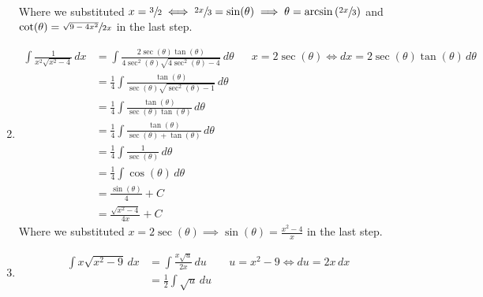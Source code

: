 \begin{Example}{}{}
\begin{enumerate}[label=(\roman*)]
\begin{align*}
              \end{align*}
              Where we substituted $ x=\sfrac{3}{2}\iff \sfrac{2x}{3}=\sin(\theta)\implies
                  \theta=\arcsin\left( \sfrac{2x}{3} \right) $ and $ \cot(\theta)=
                  \sfrac{\sqrt{9-4x^2}}{2x} $ in the last step.
        \item \begin{align*}
                  \int \frac{1}{x^2\sqrt{x^2-4}} \, d{x}
                   & =\int \frac{2\sec(\theta)\tan(\theta)}{4\sec^2(\theta)\sqrt{4\sec^2(\theta)-4}} \, d{\theta} &  & x=2\sec(\theta)\iff dx=2\sec(\theta)\tan(\theta)\,d\theta \\
                   & =\frac{1}{4} \int \frac{\tan(\theta)}{\sec(\theta)\sqrt{\sec^2(\theta)-1}}\, d{\theta}                                                                      \\
                   & =\frac{1}{4} \int \frac{\tan(\theta)}{\sec(\theta)\tan(\theta)} \, d{\theta}                                                                                \\
                   & =\frac{1}{4} \int \frac{\tan(\theta)}{\sec(\theta)+\tan(\theta)} \, d{\theta}                                                                               \\
                   & =\frac{1}{4} \int \frac{1}{\sec(\theta)} \, d{\theta}                                                                                                       \\
                   & =\frac{1}{4} \int \cos(\theta)\, d{\theta}                                                                                                                  \\
                   & =\frac{\sin(\theta)}{4} +C                                                                                                                                  \\
                   & =\frac{\sqrt{x^2-4}}{4x} +C
              \end{align*}
              Where we substituted $ x=2\sec(\theta)\implies \sin(\theta)=\frac{x^2-4}{x} $
              in the last step.
        \item \begin{align*}
                  \int x\sqrt{x^2-9}\, d{x}
                   & =\int \frac{x\sqrt{u}}{2x} \, d{u}                &  & u=x^2-9\iff du=2x\,dx \\
                   & =\frac{1}{2} \int \sqrt{u}\, d{u}                                            \\

\end{align*}
\end{enumerate}
\end{Example}
